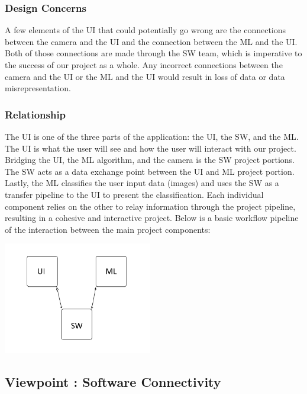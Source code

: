 \documentclass[onecolumn, draftclsnofoot,10pt, compsoc]{IEEEtran}
\begin{document}
\subsubsection{Design Concerns}
A few elements of the UI that could potentially go wrong are the connections between the camera and the UI and the connection between the ML and the UI.
Both of those connections are made through the SW team, which is imperative to the success of our project as a whole.
Any incorrect connections between the camera and the UI or the ML and the UI would result in loss of data or data misrepresentation. 
\subsubsection{Relationship}
The UI is one of the three parts of the application: the UI, the SW, and the ML. The UI is what the user will see and how the user will interact with   our project. Bridging the UI, the ML algorithm, and the camera is the SW project portions. The SW acts as a data exchange point between the UI and ML project portion. Lastly, the ML classifies the user input data (images) and uses the SW as a transfer pipeline to the UI to present the classification. Each individual component relies on the other to relay information through the project pipeline, resulting in a cohesive and interactive project. Below is a basic workflow pipeline of the interaction between the main project components:

\vskip 0.2in

\centerline{
   \includegraphics[width=65mm]{UI_graphic2.png}
}
\vskip 0.2in

\subsection{Viewpoint : Software Connectivity}
\end{document}
